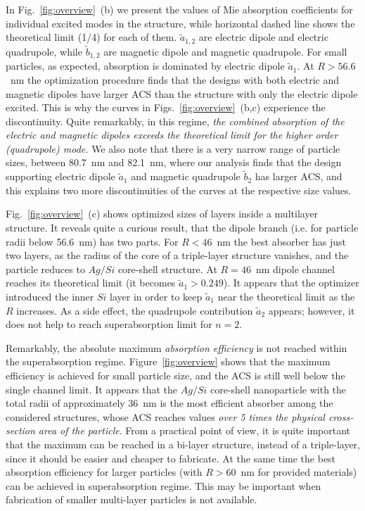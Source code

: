 \documentclass[twoside,twocolumn,9pt]{article}
\begin{document}
In Fig.~\ref{fig:overview}~(b) we present the values of Mie absorption
coefficients for individual excited modes in the structure, while
horizontal dashed line shows the theoretical limit (1/4) for each of
them. $\tilde{a}_{1,2}$ are electric dipole and electric quadrupole,
while $\tilde{b}_{1,2}$ are magnetic dipole and magnetic
quadrupole. For small particles, as expected, absorption is dominated
by electric dipole $\tilde{a}_1$.  At $R > 56.6$~nm the optimization
procedure finds that the designs with both electric and magnetic
dipoles have larger ACS than the structure with only the electric
dipole excited. This is why the curves in
Figs.~\ref{fig:overview}~(b,c) experience the discontinuity. Quite
remarkably, in this regime, {\em the combined absorption of the
  electric and magnetic dipoles exceeds the theoretical limit for the
  higher order (quadrupole) mode.}  We also note that there is a very
narrow range of particle sizes, between 80.7~nm and 82.1~nm, where our
analysis finds that the design supporting electric dipole
$\tilde{a}_1$ and magnetic quadrupole $\tilde{b}_2$ has larger ACS,
and this explains two more discontinuities of the curves at the
respective size values.

Fig.~\ref{fig:overview}~(c) shows optimized sizes of layers inside a
multilayer structure. It reveals quite a curious result, that the
dipole branch (i.e. for particle radii below 56.6~nm) has two
parts. For $R<46$~nm the best absorber has just two layers, as the
radius of the core of a triple-layer structure vanishes, and the
particle reduces to $Ag/Si$ core-shell structure.  At $R=46$~nm dipole
channel reaches its theoretical limit (it becomes
$\tilde{a}_1>0.249$).  It appears that the optimizer introduced the
inner $Si$ layer in order to keep $\tilde{a}_1$ near the theoretical
limit as the $R$ increases.  As a side effect, the quadrupole
contribution $\tilde{a}_2$ appears; however, it does not help to reach
superabsorption limit for $n=2$.

Remarkably, the absolute maximum {\em absorption efficiency} is not
reached within the superabsorption regime. Figure~\ref{fig:overview}
shows that the maximum efficiency is achieved for small particle size,
and the ACS is still well below the single channel limit. It appears
that the $Ag/Si$ core-shell nanoparticle with the total radii of
approximately 36~nm is the most efficient absorber among the
considered structures, whose ACS reaches values {\em over 5 times the
  physical cross-section area of the particle}.  From a practical
point of view, it is quite important that the maximum can be reached
in a bi-layer structure, instead of a triple-layer, since it should be
easier and cheaper to fabricate. At the same time the best absorption
efficiency for larger particles (with $R>60$~nm for provided
materials) can be achieved in superabsorption regime. This may be
important when fabrication of smaller multi-layer particles is not
available.
\end{document}
